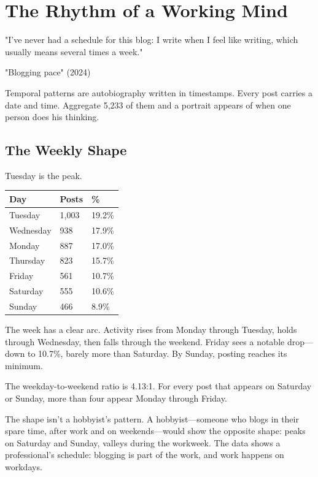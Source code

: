 \chapter{The Rhythm of a Working Mind}

\epigraph{"I've never had a schedule for this blog: I write when I feel like writing, which usually means several times a week."}{"Blogging pace" (2024)}

\bigskip

Temporal patterns are autobiography written in timestamps. Every post carries a date and time. Aggregate 5,233 of them and a portrait appears of when one person does his thinking.

\bigskip

\section*{The Weekly Shape}

Tuesday is the peak.

\begin{center}
\begin{tabular}{lll}
\toprule
\textbf{Day} & \textbf{Posts} & \textbf{\%} \\
\midrule
Tuesday & 1,003 & 19.2\% \\
Wednesday & 938 & 17.9\% \\
Monday & 887 & 17.0\% \\
Thursday & 823 & 15.7\% \\
Friday & 561 & 10.7\% \\
Saturday & 555 & 10.6\% \\
Sunday & 466 & 8.9\% \\
\bottomrule
\end{tabular}
\end{center}

The week has a clear arc. Activity rises from Monday through Tuesday, holds through Wednesday, then falls through the weekend. Friday sees a notable drop—down to 10.7\%, barely more than Saturday. By Sunday, posting reaches its minimum.


The weekday-to-weekend ratio is 4.13:1. For every post that appears on Saturday or Sunday, more than four appear Monday through Friday.

The shape isn't a hobbyist's pattern. A hobbyist—someone who blogs in their spare time, after work and on weekends—would show the opposite shape: peaks on Saturday and Sunday, valleys during the workweek. The data shows a professional's schedule: blogging is part of the work, and work happens on workdays.

